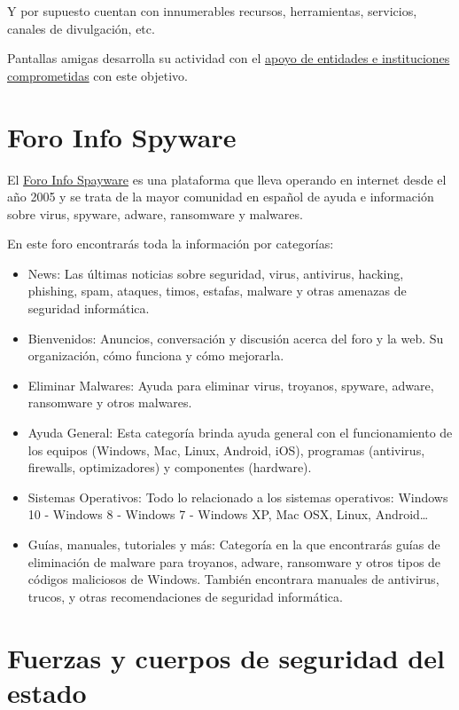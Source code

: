 \documentclass[
  a4paper,
  openany]{book}
\begin{document}
Y por supuesto cuentan con innumerables recursos, herramientas, servicios, canales de divulgación, etc.

Pantallas amigas desarrolla su actividad con el \href{https://www.pantallasamigas.net/confian-en-pantallasamigas/}{apoyo de entidades e instituciones comprometidas} con este objetivo.

\hypertarget{foro-info-spyware}{%
\section{Foro Info Spyware}\label{foro-info-spyware}}

El \href{https://forospyware.com/}{Foro Info Spayware} es una plataforma que lleva operando en internet desde el año 2005 y se trata de la mayor comunidad en español de ayuda e información sobre virus, spyware, adware, ransomware y malwares.

En este foro encontrarás toda la información por categorías:

\begin{itemize}
\item
  News: Las últimas noticias sobre seguridad, virus, antivirus, hacking, phishing, spam, ataques, timos, estafas, malware y otras amenazas de seguridad informática.
\item
  Bienvenidos: Anuncios, conversación y discusión acerca del foro y la web. Su organización, cómo funciona y cómo mejorarla.
\item
  Eliminar Malwares: Ayuda para eliminar virus, troyanos, spyware, adware, ransomware y otros malwares.
\item
  Ayuda General: Esta categoría brinda ayuda general con el funcionamiento de los equipos (Windows, Mac, Linux, Android, iOS), programas (antivirus, firewalls, optimizadores) y componentes (hardware).
\item
  Sistemas Operativos: Todo lo relacionado a los sistemas operativos: Windows 10 - Windows 8 - Windows 7 - Windows XP, Mac OSX, Linux, Android\ldots{}
\item
  Guías, manuales, tutoriales y más: Categoría en la que encontrarás guías de eliminación de malware para troyanos, adware, ransomware y otros tipos de códigos maliciosos de Windows. También encontrara manuales de antivirus, trucos, y otras recomendaciones de seguridad informática.
\end{itemize}

\hypertarget{fuerzas-y-cuerpos-de-seguridad-del-estado}{%
\section{Fuerzas y cuerpos de seguridad del estado}\label{fuerzas-y-cuerpos-de-seguridad-del-estado}}
\end{document}
